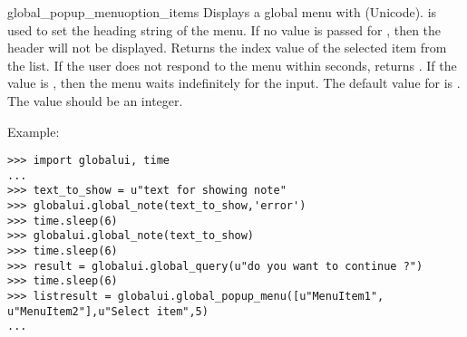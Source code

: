 \begin{funcdesc}{global_popup_menu}{option_items} 
Displays a global menu with (Unicode).  is used to set the 
heading string of the menu. If no value is passed for , then the header will
not be displayed. Returns the index value of the selected item from the list. If the user does
not respond to the menu within  seconds, returns . If the 
value is , then the menu waits indefinitely for the input. The default value for  
is . The  value should be an integer.
\end{funcdesc}

Example:
\begin{verbatim}
>>> import globalui, time
...
>>> text_to_show = u"text for showing note"
>>> globalui.global_note(text_to_show,'error')
>>> time.sleep(6)
>>> globalui.global_note(text_to_show)
>>> time.sleep(6)
>>> result = globalui.global_query(u"do you want to continue ?")
>>> time.sleep(6)
>>> listresult = globalui.global_popup_menu([u"MenuItem1", u"MenuItem2"],u"Select item",5)
...   
\end{verbatim}
